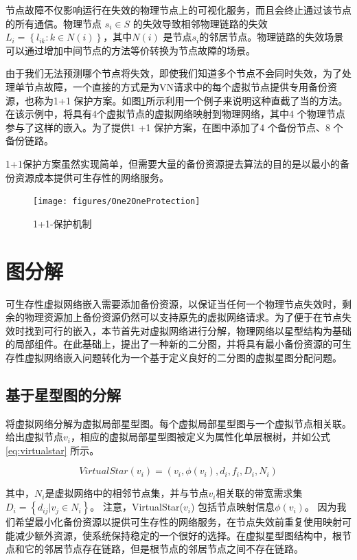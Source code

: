 节点故障不仅影响运行在失效的物理节点上的可视化服务，而且会终止通过该节点的所有通信。物理节点 $ {s_i} \in S $ 的失效导致相邻物理链路的失效${L_i} = \left\{ {{l_{ik}}:k \in N(i)} \right\}$，其中${N(i)}$ 是节点$ {s_i} $的邻居节点。物理链路的失效场景可以通过增加中间节点的方法等价转换为节点故障的场景。

由于我们无法预测哪个节点将失效，即使我们知道多个节点不会同时失效，为了处理单节点故障，一个直接的方式是为VN请求中的每个虚拟节点提供专用备份资源，也称为1+1 保护方案。如图\ref{fig:One2OneProtection}所示利用一个例子来说明这种直截了当的方法。在该示例中，将具有4个虚拟节点的虚拟网络映射到物理网络，其中4 个物理节点参与了这样的嵌入。为了提供1 +1 保护方案，在图中添加了4 个备份节点、8 个备份链路。

1+1保护方案虽然实现简单，但需要大量的备份资源提去算法的目的是以最小的备份资源成本提供可生存性的网络服务。

\begin{figure}[htbp]
\centering
\texttt{[image: figures/One2OneProtection]}\\
\caption{1+1-保护机制}\label{fig:One2OneProtection}
\end{figure}
\section{图分解}
可生存性虚拟网络嵌入需要添加备份资源，以保证当任何一个物理节点失效时，剩余的物理资源加上备份资源仍然可以支持原先的虚拟网络请求。为了便于在节点失效时找到可行的嵌入，本节首先对虚拟网络进行分解，物理网络以星型结构为基础的局部组件。在此基础上，提出了一种新的二分图，并将具有最小备份资源的可生存性虚拟网络嵌入问题转化为一个基于定义良好的二分图的虚拟星图分配问题。
\subsection{基于星型图的分解}
将虚拟网络分解为虚拟局部星型图。每个虚拟局部星型图与一个虚拟节点相关联。给出虚拟节点$v_i$，相应的虚拟局部星型图被定义为属性化单层根树，并如公式\ref{eq:virtualstar} 所示。

\begin{equation}
VirtualStar(v_i)=(v_i, \phi(v_i), d_i, f_i, D_i, N_i)
\label{eq:virtualstar}
\end{equation}


其中，$N_i$是虚拟网络中的相邻节点集，并与节点$v_i$相关联的带宽需求集${D_i} = \left\{ {{d_{ij}}|{v_j} \in {N_i}} \right\} $。 注意，VirtualStar($v_i$) 包括节点映射信息$\phi(v_i)$。 因为我们希望最小化备份资源以提供可生存性的网络服务，在节点失效前重复使用映射可能减少额外资源，使系统保持稳定的一个很好的选择。在虚拟星型图结构中，根节点和它的邻居节点存在链路，但是根节点的邻居节点之间不存在链路。

